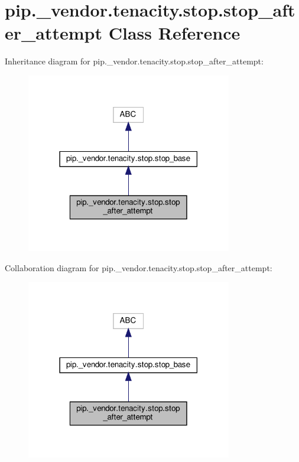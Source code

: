 \hypertarget{classpip_1_1__vendor_1_1tenacity_1_1stop_1_1stop__after__attempt}{}\section{pip.\+\_\+vendor.\+tenacity.\+stop.\+stop\+\_\+after\+\_\+attempt Class Reference}
\label{classpip_1_1__vendor_1_1tenacity_1_1stop_1_1stop__after__attempt}


Inheritance diagram for pip.\+\_\+vendor.\+tenacity.\+stop.\+stop\+\_\+after\+\_\+attempt\+:
\nopagebreak
\begin{figure}[H]
\begin{center}
\leavevmode
\includegraphics[width=254pt]{classpip_1_1__vendor_1_1tenacity_1_1stop_1_1stop__after__attempt__inherit__graph}
\end{center}
\end{figure}


Collaboration diagram for pip.\+\_\+vendor.\+tenacity.\+stop.\+stop\+\_\+after\+\_\+attempt\+:
\nopagebreak
\begin{figure}[H]
\begin{center}
\leavevmode
\includegraphics[width=254pt]{classpip_1_1__vendor_1_1tenacity_1_1stop_1_1stop__after__attempt__coll__graph}
\end{center}
\end{figure}
